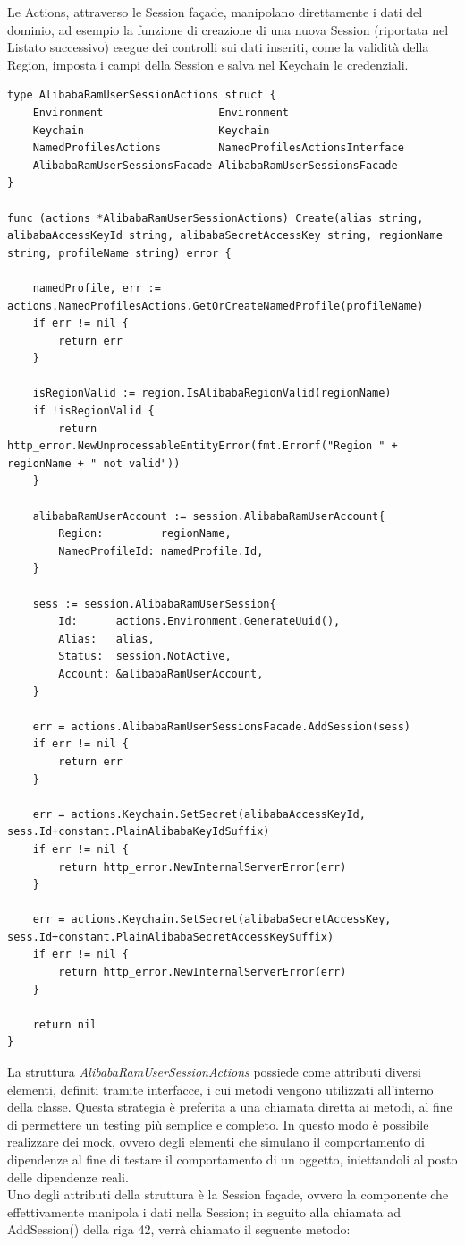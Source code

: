 \documentclass[a4paper]{article}
\begin{document}
Le Actions, attraverso le Session façade, manipolano direttamente i dati del dominio, ad esempio la funzione di creazione di una nuova Session (riportata nel Listato successivo) esegue dei controlli sui dati inseriti, come la validità della Region, imposta i campi della Session e salva nel Keychain le credenziali.

\begin{lstlisting}[style=customgo, caption=alibaba\_ram\_user\_session\_actions.go (righe 11-58), captionpos=b, firstnumber=11]
type AlibabaRamUserSessionActions struct {
	Environment                  Environment
	Keychain                     Keychain
	NamedProfilesActions         NamedProfilesActionsInterface
	AlibabaRamUserSessionsFacade AlibabaRamUserSessionsFacade
}

func (actions *AlibabaRamUserSessionActions) Create(alias string, alibabaAccessKeyId string, alibabaSecretAccessKey string, regionName string, profileName string) error {

	namedProfile, err := actions.NamedProfilesActions.GetOrCreateNamedProfile(profileName)
	if err != nil {
		return err
	}

	isRegionValid := region.IsAlibabaRegionValid(regionName)
	if !isRegionValid {
		return http_error.NewUnprocessableEntityError(fmt.Errorf("Region " + regionName + " not valid"))
	}

	alibabaRamUserAccount := session.AlibabaRamUserAccount{
		Region:         regionName,
		NamedProfileId: namedProfile.Id,
	}

	sess := session.AlibabaRamUserSession{
		Id:      actions.Environment.GenerateUuid(),
		Alias:   alias,
		Status:  session.NotActive,
		Account: &alibabaRamUserAccount,
	}

	err = actions.AlibabaRamUserSessionsFacade.AddSession(sess)
	if err != nil {
		return err
	}

	err = actions.Keychain.SetSecret(alibabaAccessKeyId, sess.Id+constant.PlainAlibabaKeyIdSuffix)
	if err != nil {
		return http_error.NewInternalServerError(err)
	}

	err = actions.Keychain.SetSecret(alibabaSecretAccessKey, sess.Id+constant.PlainAlibabaSecretAccessKeySuffix)
	if err != nil {
		return http_error.NewInternalServerError(err)
	}

	return nil
}
\end{lstlisting}

La struttura \textit{AlibabaRamUserSessionActions} possiede come attributi diversi elementi, definiti tramite interfacce, i cui metodi vengono utilizzati all'interno della classe. Questa strategia è preferita a una chiamata diretta ai metodi, al fine di permettere un testing più semplice e completo. In questo modo è possibile realizzare dei mock, ovvero degli elementi che simulano il comportamento di dipendenze al fine di testare il comportamento di un oggetto, iniettandoli al posto delle dipendenze reali.\\
Uno degli attributi della struttura è la Session façade, ovvero la componente che effettivamente manipola i dati nella Session; in seguito alla chiamata ad AddSession() della riga 42, verrà chiamato il seguente metodo:
\end{document}
